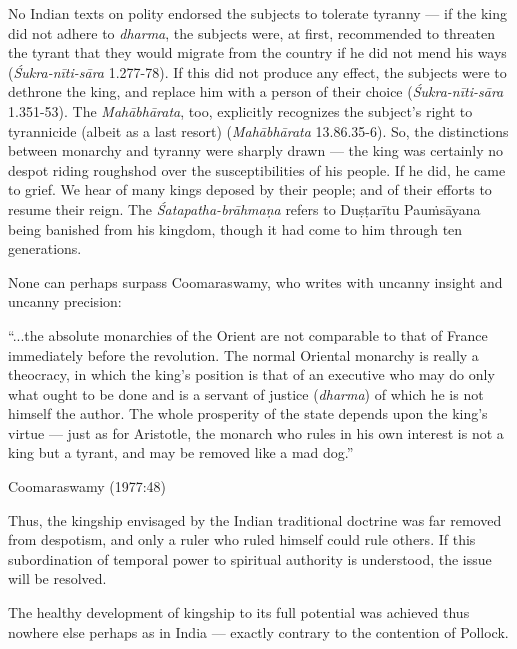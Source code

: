 No Indian texts on polity endorsed the subjects to tolerate tyranny --- if the king did not adhere to {\sl dharma}, the subjects were, at first, recommended to threaten the tyrant that they would migrate from the country if he did not mend his ways ({\sl Śukra-nīti-sāra} 1.277-78). If this did not produce any effect, the subjects were to dethrone the king, and replace him with a person of their choice ({\sl Śukra-nīti-sāra} 1.351-53). The {\sl Mahābhārata}, too, explicitly recognizes the subject’s right to tyrannicide (albeit as a last resort) ({\sl Mahābhārata} 13.86.35-6). So, the distinctions between monarchy and tyranny were sharply drawn --- the king was certainly no despot riding roughshod over the susceptibilities of his people. If he did, he came to grief. We hear of many kings deposed by their people; and of their efforts to resume their reign.  The {\sl Śatapatha-brāhmaṇa} refers to Duṣṭarītu Pauṁsāyana being banished from his kingdom, though it had come to him through ten generations. 

None can perhaps surpass Coomaraswamy, who writes with uncanny insight and uncanny precision: 

\begin{myquote}
“...the absolute monarchies of the Orient are not comparable to that of France immediately before the revolution. The normal Oriental monarchy is really a theocracy, in which the king’s position is that of an executive who may do only what ought to be done and is a servant of justice ({\sl dharma}) of which he is not himself the author. The whole prosperity of the state depends upon the king’s virtue --- just as for Aristotle, the monarch who rules in his own interest is not a king but a tyrant, and may be removed like a mad dog.”

\hfill Coomaraswamy (1977:48)
\end{myquote}

Thus, the kingship envisaged by the Indian traditional doctrine was far removed from despotism, and only a ruler who ruled himself could rule others.  If this subordination of temporal power to spiritual authority is understood, the issue will be resolved.  

The healthy development of kingship to its full potential was achieved thus nowhere else perhaps as in India --- exactly contrary to the contention of Pollock.

